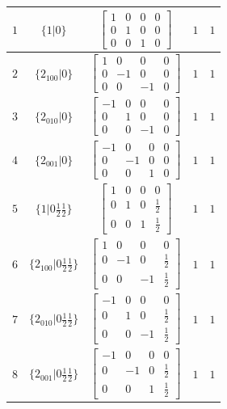 \documentclass[fleqn,8pt]{jsarticle}
\begin{document}
\begin{longtable}{ccccc}
$ 1 $ & $ \{1|0\} $ & $ \begin{bmatrix} 1 & 0 & 0 & 0 \\ 0 & 1 & 0 & 0 \\ 0 & 0 & 1 & 0 \end{bmatrix} $ & $ 1 $ & $ 1 $ \\ \hline
$ 2 $ & $ \{2{}_{100}|0\} $ & $ \begin{bmatrix} 1 & 0 & 0 & 0 \\ 0 & -1 & 0 & 0 \\ 0 & 0 & -1 & 0 \end{bmatrix} $ & $ 1 $ & $ 1 $ \\ \hline
$ 3 $ & $ \{2{}_{010}|0\} $ & $ \begin{bmatrix} -1 & 0 & 0 & 0 \\ 0 & 1 & 0 & 0 \\ 0 & 0 & -1 & 0 \end{bmatrix} $ & $ 1 $ & $ 1 $ \\ \hline
$ 4 $ & $ \{2{}_{001}|0\} $ & $ \begin{bmatrix} -1 & 0 & 0 & 0 \\ 0 & -1 & 0 & 0 \\ 0 & 0 & 1 & 0 \end{bmatrix} $ & $ 1 $ & $ 1 $ \\ \hline
$ 5 $ & $ \{1|0 \frac{1}{2} \frac{1}{2}\} $ & $ \begin{bmatrix} 1 & 0 & 0 & 0 \\ 0 & 1 & 0 & \frac{1}{2} \\ 0 & 0 & 1 & \frac{1}{2} \end{bmatrix} $ & $ 1 $ & $ 1 $ \\ \hline
$ 6 $ & $ \{2{}_{100}|0 \frac{1}{2} \frac{1}{2}\} $ & $ \begin{bmatrix} 1 & 0 & 0 & 0 \\ 0 & -1 & 0 & \frac{1}{2} \\ 0 & 0 & -1 & \frac{1}{2} \end{bmatrix} $ & $ 1 $ & $ 1 $ \\ \hline
$ 7 $ & $ \{2{}_{010}|0 \frac{1}{2} \frac{1}{2}\} $ & $ \begin{bmatrix} -1 & 0 & 0 & 0 \\ 0 & 1 & 0 & \frac{1}{2} \\ 0 & 0 & -1 & \frac{1}{2} \end{bmatrix} $ & $ 1 $ & $ 1 $ \\ \hline
$ 8 $ & $ \{2{}_{001}|0 \frac{1}{2} \frac{1}{2}\} $ & $ \begin{bmatrix} -1 & 0 & 0 & 0 \\ 0 & -1 & 0 & \frac{1}{2} \\ 0 & 0 & 1 & \frac{1}{2} \end{bmatrix} $ & $ 1 $ & $ 1 $ \\ \hline

\end{longtable}
\end{document}
